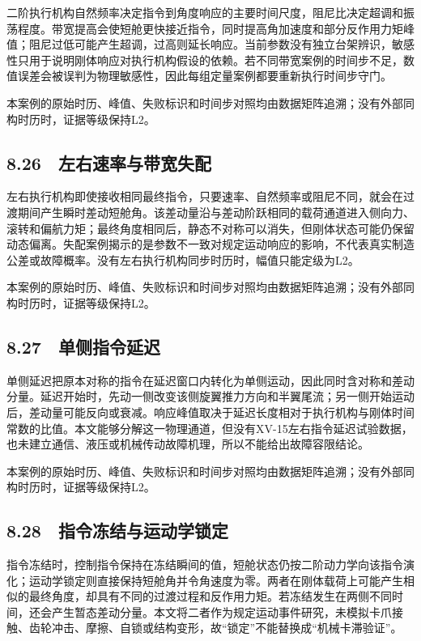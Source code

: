 \documentclass[UTF8,12pt,openany]{ctexbook}
\begin{document}
二阶执行机构自然频率决定指令到角度响应的主要时间尺度，阻尼比决定超调和振荡程度。带宽提高会使短舱更快接近指令，同时提高角加速度和部分反作用力矩峰值；阻尼过低可能产生超调，过高则延长响应。当前参数没有独立台架辨识，敏感性只用于说明刚体响应对执行机构假设的依赖。若不同带宽案例的时间步不足，数值误差会被误判为物理敏感性，因此每组定量案例都要重新执行时间步守门。

本案例的原始时历、峰值、失败标识和时间步对照均由数据矩阵追溯；没有外部同构时历时，证据等级保持L2。

\subsection{8.26　左右速率与带宽失配}

左右执行机构即使接收相同最终指令，只要速率、自然频率或阻尼不同，就会在过渡期间产生瞬时差动短舱角。该差动量沿与差动阶跃相同的载荷通道进入侧向力、滚转和偏航力矩；最终角度相同后，静态不对称可以消失，但刚体状态可能仍保留动态偏离。失配案例揭示的是参数不一致对规定运动响应的影响，不代表真实制造公差或故障概率。没有左右执行机构同步时历时，幅值只能定级为L2。

本案例的原始时历、峰值、失败标识和时间步对照均由数据矩阵追溯；没有外部同构时历时，证据等级保持L2。

\subsection{8.27　单侧指令延迟}

单侧延迟把原本对称的指令在延迟窗口内转化为单侧运动，因此同时含对称和差动分量。延迟开始时，先动一侧改变该侧旋翼推力方向和半翼尾流；另一侧开始运动后，差动量可能反向或衰减。响应峰值取决于延迟长度相对于执行机构与刚体时间常数的比值。本文能够分解这一物理通道，但没有XV-15左右指令延迟试验数据，也未建立通信、液压或机械传动故障机理，所以不能给出故障容限结论。

本案例的原始时历、峰值、失败标识和时间步对照均由数据矩阵追溯；没有外部同构时历时，证据等级保持L2。

\subsection{8.28　指令冻结与运动学锁定}

指令冻结时，控制指令保持在冻结瞬间的值，短舱状态仍按二阶动力学向该指令演化；运动学锁定则直接保持短舱角并令角速度为零。两者在刚体载荷上可能产生相似的最终角度，却具有不同的过渡过程和反作用力矩。若冻结发生在两侧不同时间，还会产生暂态差动分量。本文将二者作为规定运动事件研究，未模拟卡爪接触、齿轮冲击、摩擦、自锁或结构变形，故“锁定”不能替换成“机械卡滞验证”。
\end{document}
